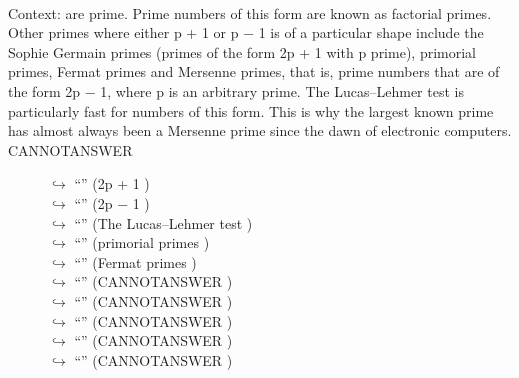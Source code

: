 \documentclass[11pt,a4paper, onecolumn]{article}
\begin{document}
\\ Context: are prime. Prime numbers of this form are known as factorial primes. Other primes where either p + 1 or p − 1 is of a particular shape include the Sophie Germain primes (primes of the form 2p + 1 with p prime), primorial primes, Fermat primes and Mersenne primes, that is, prime numbers that are of the form 2p − 1, where p is an arbitrary prime. The Lucas–Lehmer test is particularly fast for numbers of this form. This is why the largest known prime has almost always been a Mersenne prime since the dawn of electronic computers. CANNOTANSWER

\begin{figure}[t] \small \begin{tcolorbox}[boxsep=0pt,left=5pt,right=0pt,top=2pt,colback = yellow!5] \begin{dialogue}
 \small 
\colorbox{pink!25}{$\hookrightarrow$}
{ ``'' (2p + 1 ) }
\\
\colorbox{pink!25}{$\hookrightarrow$}
{ ``'' (2p − 1 ) }
\\
\colorbox{pink!25}{$\hookrightarrow$}
{ ``'' (The Lucas–Lehmer test ) }
\\
\colorbox{pink!25}{$\hookrightarrow$}
{ ``'' (primorial primes ) }
\\
\colorbox{pink!25}{$\hookrightarrow$}
{ ``'' (Fermat primes ) }
\\
\colorbox{pink!25}{$\hookrightarrow$}
{ ``'' (CANNOTANSWER ) }
\\
\colorbox{pink!25}{$\hookrightarrow$}
{ ``'' (CANNOTANSWER ) }
\\
\colorbox{pink!25}{$\hookrightarrow$}
{ ``'' (CANNOTANSWER ) }
\\
\colorbox{pink!25}{$\hookrightarrow$}
{ ``'' (CANNOTANSWER ) }
\\
\colorbox{pink!25}{$\hookrightarrow$}
{ ``'' (CANNOTANSWER ) }
\\
 \end{dialogue}\end{tcolorbox}\end{figure}
\end{document}
